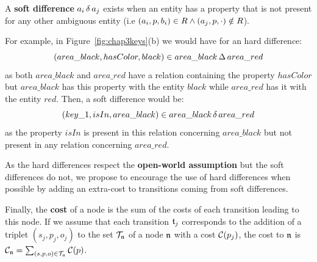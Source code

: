 \documentclass[a4paper,11pt,twoside]{StyleThese}
\begin{document}
\begin{definition}
A \textbf{soft difference} $a_i \,\delta\, a_j$ exists when an entity has a property that is not present for any other ambiguous entity (i.e $(a_i, p, b_i) \in R \land (a_j, p, \cdot) \notin R$).
\end{definition}

For example, in Figure~\ref{fig:chap3keys}(b) we would have for an hard difference: 
\begin{equation*}
(area\_black, hasColor, black) \in area\_black \,\Delta\, area\_red
\end{equation*}
as both $area\_black$ and $area\_red$ have a relation containing the property $hasColor$ but $area\_black$ has this property with the entity $black$ while $area\_red$ has it with the entity $red$. Then, a soft difference would be: 
\begin{equation*}
(key\_1, isIn, area\_black) \in area\_black \,\delta\, area\_red
\end{equation*}
as the property $isIn$ is present in this relation concerning $area\_black$ but not present in any relation concerning $area\_red$.

As the hard differences respect the \textbf{open-world assumption} but the soft differences do not, we propose to encourage the use of hard differences when possible by adding an extra-cost to transitions coming from soft differences.

Finally, the \textbf{cost} of a node is the sum of the costs of each transition leading to this node. If we assume that each transition $\mathfrak{t}_j$ corresponds to the addition of a triplet $(s_j, p_j, o_j)$ to the set $\mathcal{T}_{\mathfrak{n}}$ of a node $\mathfrak{n}$ with a cost $\mathcal{C}(p_j)$, the cost to $\mathfrak{n}$ is $\mathcal{C}_{\mathfrak{n}} = \sum_{(s, p, o) \in \mathcal{T}_{\mathfrak{n}}} \mathcal{C}(p)$. 
\end{document}
